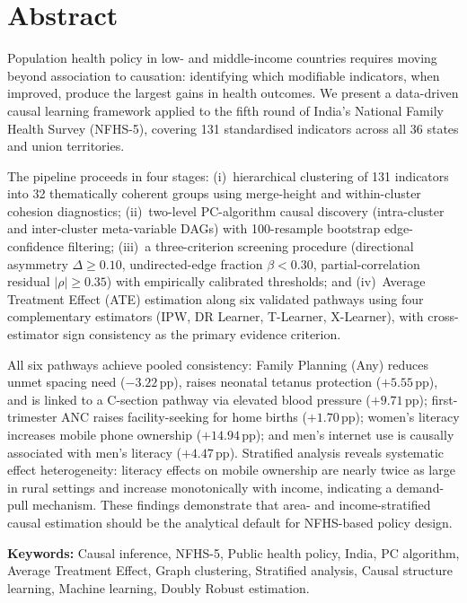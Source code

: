 \documentclass[12pt,a4paper]{report}
\begin{document}
\chapter*{Abstract}

Population health policy in low- and middle-income countries requires moving
beyond association to causation: identifying which modifiable indicators, when
improved, produce the largest gains in health outcomes.
We present a data-driven causal learning framework applied to the fifth round
of India's National Family Health Survey (NFHS-5), covering 131 standardised
indicators across all 36 states and union territories.

The pipeline proceeds in four stages: (i)~hierarchical clustering of 131
indicators into 32 thematically coherent groups using merge-height and
within-cluster cohesion diagnostics; (ii)~two-level PC-algorithm causal
discovery (intra-cluster and inter-cluster meta-variable DAGs) with 100-resample
bootstrap edge-confidence filtering; (iii)~a three-criterion screening procedure
(directional asymmetry $\Delta\ge0.10$, undirected-edge fraction $\beta<0.30$,
partial-correlation residual $|\rho|\ge0.35$) with empirically calibrated
thresholds; and (iv)~Average Treatment Effect (ATE) estimation along six
validated pathways using four complementary estimators (IPW, DR Learner,
T-Learner, X-Learner), with cross-estimator sign consistency as the primary
evidence criterion.

All six pathways achieve pooled consistency: Family Planning (Any) reduces
unmet spacing need ($-3.22$\,pp), raises neonatal tetanus protection
($+5.55$\,pp), and is linked to a C-section pathway via elevated blood pressure
($+9.71$\,pp); first-trimester ANC raises facility-seeking for home births
($+1.70$\,pp); women's literacy increases mobile phone ownership ($+14.94$\,pp);
and men's internet use is causally associated with men's literacy ($+4.47$\,pp).
Stratified analysis reveals systematic effect heterogeneity: literacy effects on
mobile ownership are nearly twice as large in rural settings and increase
monotonically with income, indicating a demand-pull mechanism.
These findings demonstrate that area- and income-stratified causal estimation
should be the analytical default for NFHS-based policy design.

\vspace{1em}
\noindent\textbf{Keywords:} Causal inference, NFHS-5, Public health policy,
India, PC algorithm, Average Treatment Effect, Graph clustering, Stratified
analysis, Causal structure learning, Machine learning, Doubly Robust estimation.
\end{document}
